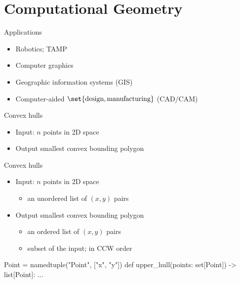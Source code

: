 \documentclass[aspectratio=169]{beamer}
\begin{document}
\section{Computational Geometry}

\begin{frame}{Applications}
    \begin{itemize}[<+->]
        \item Robotics; TAMP
        \item Computer graphics
        \item Geographic information systems (GIS)
        \item Computer-aided $\set{\text{design}, \text{manufacturing}}$ (CAD/CAM)
    \end{itemize}
\end{frame}



\begin{frame}{Convex hulls}
    \begin{itemize}
        \item Input: $n$ points in 2D space
        \item Output smallest convex bounding polygon
    \end{itemize}
\end{frame}

\begin{frame}[fragile]{Convex hulls}
    \begin{itemize}
        \item Input: $n$ points in 2D space
              \begin{itemize}
                  \item an unordered list of $(x, y)$ pairs
              \end{itemize}
        \item Output smallest convex bounding polygon
              \begin{itemize}
                  \item an ordered list of $(x, y)$ pairs
                  \item subset of the input; in CCW order
              \end{itemize}
    \end{itemize}

    \begin{pycode}[]
        Point = namedtuple("Point", ["x", "y"])
        def upper_hull(points: set[Point]) -> list[Point]:
            ...
    \end{pycode}
\end{frame}
\end{document}
